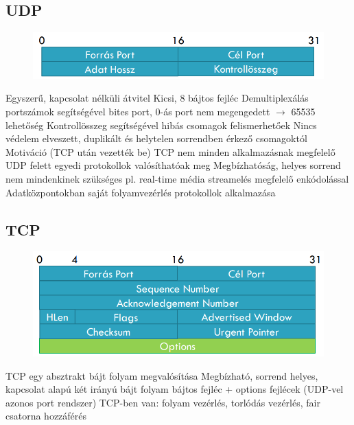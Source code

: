 \documentclass[12pt,a4paper]{article}
\begin{document}
\pagebreak

\subsection{UDP}

\begin{figure}[h!]
	\centering
	\includegraphics[width=0.7\linewidth]{"udp-header"}
\end{figure}

\begin{outline}
	\1 Egyszerű, kapcsolat nélküli átvitel
	\1 Kicsi, 8 bájtos fejléc
		\2 Demultiplexálás portszámok segítségével
			 bites port, 0-ás port nem megengedett $\to$ 65535 lehetőség
		\2 Kontrollösszeg segítségével hibás csomagok felismerhetőek
			\3 Nincs védelem elveszett, duplikált és helytelen sorrendben érkező csomagoktól
	\1 Motiváció (TCP után vezették be)
		\2 TCP nem minden alkalmazásnak megfelelő
		\2 UDP felett egyedi protokollok valósíthatóak meg
			\3 Megbízhatóság, helyes sorrend nem mindenkinek szükséges
				\4 pl. real-time média streamelés megfelelő enkódolással
			\3 Adatközpontokban saját folyamvezérlés protokollok alkalmazása
\end{outline}

\subsection{TCP}

\begin{figure}[h!]
	\centering
	\includegraphics[width=0.7\linewidth]{"tcp-header"}
\end{figure}

\begin{outline}
	\1 TCP egy absztrakt bájt folyam megvalósítása
	\1 Megbízható, sorrend helyes, kapcsolat alapú két irányú bájt folyam
	 bájtos fejléc + options fejlécek (UDP-vel azonos port rendszer)
	\1 TCP-ben van: folyam vezérlés, torlódás vezérlés, fair csatorna hozzáférés
\end{outline}
\end{document}
